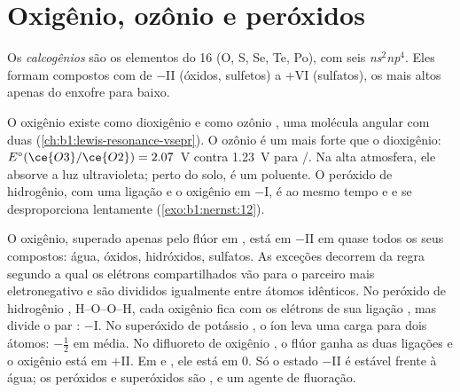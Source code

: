 \section{Oxigênio, ozônio e peróxidos}

\begin{definition}[Calcogênios]\label{def:b1:p-block-16-18:chalcogen}
Os \emph{calcogênios} são os elementos do  16
(O, S, Se, Te, Po), com seis  \textit{ns}$^2$\textit{np}$^4$.
Eles formam compostos com  de $-$II (óxidos, sulfetos)
a $+$VI (sulfatos), os mais altos apenas do enxofre para baixo.
\end{definition}

O oxigênio existe como dioxigênio  e como ozônio , uma
molécula angular com duas  (\cref{ch:b1:lewis-resonance-vsepr}).
O ozônio é um  mais forte que o dioxigênio: $E^\circ(\ce{O3}/\ce{O2}) = 2.07$~V
contra 1.23~V para /. Na alta atmosfera, ele absorve a luz
ultravioleta; perto do solo, é um poluente. O peróxido de hidrogênio, com
uma ligação  e o oxigênio em $-$I, é ao mesmo tempo  e
 e se desproporciona lentamente (\cref{exo:b1:nernst:12}).

\begin{example}
O oxigênio, superado apenas pelo flúor em , está em
$-$II em quase todos os seus compostos: água, óxidos, hidróxidos,
sulfatos. As exceções decorrem da regra segundo a qual os elétrons
compartilhados vão para o parceiro mais eletronegativo e são divididos
igualmente entre átomos idênticos. No peróxido de hidrogênio ,
H--O--O--H, cada oxigênio fica com os elétrons de sua ligação ,
mas divide o par : $-$I. No superóxido de potássio , o
íon  leva uma carga para dois átomos: $-\frac12$ em média. No
difluoreto de oxigênio , o flúor ganha as duas ligações e o
oxigênio está em $+$II. Em  e , ele está em 0. Só o estado
$-$II é estável frente à água; os peróxidos e superóxidos são , e
 um agente de fluoração.
\end{example}

